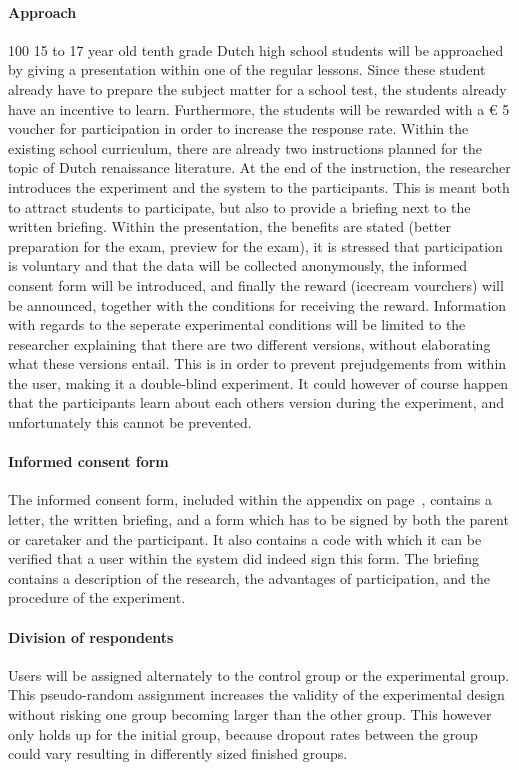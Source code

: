 \paragraph{Approach} 100 15 to 17 year old tenth grade Dutch high school students will be approached by giving a presentation within one of the regular lessons. Since these student already have to prepare the subject matter for a school test, the students already have an incentive to learn. Furthermore, the students will be rewarded with a \euro{} 5 voucher for participation in order to increase the response rate. Within the existing school curriculum, there are already two instructions planned for the topic of Dutch renaissance literature. At the end of the instruction, the researcher introduces the experiment and the system to the participants. This is meant both to attract students to participate, but also to provide a briefing next to the written briefing. Within the presentation, the benefits are stated (better preparation for the exam, preview for the exam), it is stressed that participation is voluntary and that the data will be collected anonymously, the informed consent form will be introduced, and finally the reward (icecream vourchers) will be announced, together with the conditions for receiving the reward. Information with regards to the seperate experimental conditions will be limited to the researcher explaining that there are two different versions, without elaborating what these versions entail. This is in order to prevent prejudgements from within the user, making it a double-blind experiment. It could however of course happen that the participants learn about each others version during the experiment, and unfortunately this cannot be prevented.

\paragraph{Informed consent form} The informed consent form, included within the  appendix on page~\pageref{app:consentform}, contains a letter, the written briefing, and a form which has to be signed by both the parent or caretaker and the participant. It also contains a code with which it can be verified that a user within the system did indeed sign this form. The briefing contains a description of the research, the advantages of participation, and the procedure of the experiment.

\paragraph{Division of respondents} Users will be assigned alternately to the control group or the experimental group. This pseudo-random assignment increases the validity of the experimental design without risking one group becoming larger than the other group. This however only holds up for the initial group, because dropout rates between the group could vary resulting in differently sized finished groups.

